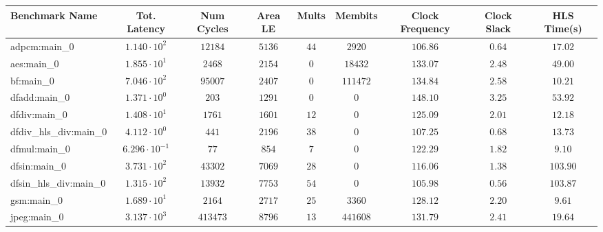 \begin{tabular}{|l|c|c|c|c|c|c|c|c|}
\hline
Benchmark Name          & Tot. Latency            & Num Cycles & Area LE   & Mults   & Membits    & Clock Frequency & Clock Slack & HLS Time(s) \\
\hline
adpcm:main\_0           & $ 1.140 \cdot 10^{2}  $ & $ 12184  $ & $ 5136  $ & $ 44  $ & $ 2920   $ & $ 106.86      $ & $ 0.64    $ & $ 17.02   $ \\
aes:main\_0             & $ 1.855 \cdot 10^{1}  $ & $ 2468   $ & $ 2154  $ & $ 0   $ & $ 18432  $ & $ 133.07      $ & $ 2.48    $ & $ 49.00   $ \\
bf:main\_0              & $ 7.046 \cdot 10^{2}  $ & $ 95007  $ & $ 2407  $ & $ 0   $ & $ 111472 $ & $ 134.84      $ & $ 2.58    $ & $ 10.21   $ \\
dfadd:main\_0           & $ 1.371 \cdot 10^{0}  $ & $ 203    $ & $ 1291  $ & $ 0   $ & $ 0      $ & $ 148.10      $ & $ 3.25    $ & $ 53.92   $ \\
dfdiv:main\_0           & $ 1.408 \cdot 10^{1}  $ & $ 1761   $ & $ 1601  $ & $ 12  $ & $ 0      $ & $ 125.09      $ & $ 2.01    $ & $ 12.18   $ \\
dfdiv\_hls\_div:main\_0 & $ 4.112 \cdot 10^{0}  $ & $ 441    $ & $ 2196  $ & $ 38  $ & $ 0      $ & $ 107.25      $ & $ 0.68    $ & $ 13.73   $ \\
dfmul:main\_0           & $ 6.296 \cdot 10^{-1} $ & $ 77     $ & $ 854   $ & $ 7   $ & $ 0      $ & $ 122.29      $ & $ 1.82    $ & $ 9.10    $ \\
dfsin:main\_0           & $ 3.731 \cdot 10^{2}  $ & $ 43302  $ & $ 7069  $ & $ 28  $ & $ 0      $ & $ 116.06      $ & $ 1.38    $ & $ 103.90  $ \\
dfsin\_hls\_div:main\_0 & $ 1.315 \cdot 10^{2}  $ & $ 13932  $ & $ 7753  $ & $ 54  $ & $ 0      $ & $ 105.98      $ & $ 0.56    $ & $ 103.87  $ \\
gsm:main\_0             & $ 1.689 \cdot 10^{1}  $ & $ 2164   $ & $ 2717  $ & $ 25  $ & $ 3360   $ & $ 128.12      $ & $ 2.20    $ & $ 9.61    $ \\
jpeg:main\_0            & $ 3.137 \cdot 10^{3}  $ & $ 413473 $ & $ 8796  $ & $ 13  $ & $ 441608 $ & $ 131.79      $ & $ 2.41    $ & $ 19.64   $ \\

\end{tabular}
